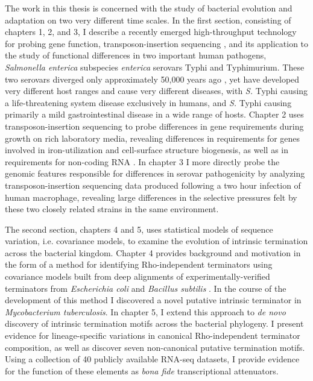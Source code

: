 The work in this thesis is concerned with the study of bacterial evolution and adaptation on two very different time scales. In the first section, consisting of chapters 1, 2, and 3, I describe a recently emerged high-throughput technology for probing gene function, transposon-insertion sequencing \parencite{Barquist2013}, and its application to the study of functional differences in two important human pathogens, \textit{Salmonella enterica} subspecies \textit{enterica} serovars Typhi and Typhimurium. These two serovars diverged only approximately 50,000 years ago \parencite{Kidgell2002}, yet have developed very different host ranges and cause very different diseases, with \textit{S.} Typhi causing a life-threatening system disease exclusively in humans, and \textit{S.} Typhi causing primarily a mild gastrointestinal disease in a wide range of hosts. Chapter 2 uses transposon-insertion sequencing to probe differences in gene requirements during growth on rich laboratory media, revealing differences in requirements for genes involved in iron-utilization and cell-surface structure biogenesis, as well as in requirements for non-coding RNA \parencite{Barquist2013a}. In chapter 3 I more directly probe the genomic features responsible for differences in serovar pathogenicity by analyzing transposon-insertion sequencing data produced following a two hour infection of human macrophage, revealing large differences in the selective pressures felt by these two closely related strains in the same environment.

The second section, chapters 4 and 5, uses statistical models of sequence variation, i.e. covariance models, to examine the evolution of intrinsic termination across the bacterial kingdom. Chapter 4 provides background and motivation in the form of a method for identifying Rho-independent terminators using covariance models built from deep alignments of experimentally-verified terminators from \textit{Escherichia coli} and \textit{Bacillus subtilis} \parencite{Gardner2011a}. In the course of the development of this method I discovered a novel putative intrinsic terminator in \textit{Mycobacterium tuberculosis}. In chapter 5, I extend this approach to \textit{de novo} discovery of intrinsic termination motifs across the bacterial phylogeny. I present evidence for lineage-specific variations in canonical Rho-independent terminator composition, as well as discover seven non-canonical putative termination motifs. Using a collection of 40 publicly available RNA-seq datasets, I provide evidence for the function of these elements as \textit{bona fide} transcriptional attenuators.